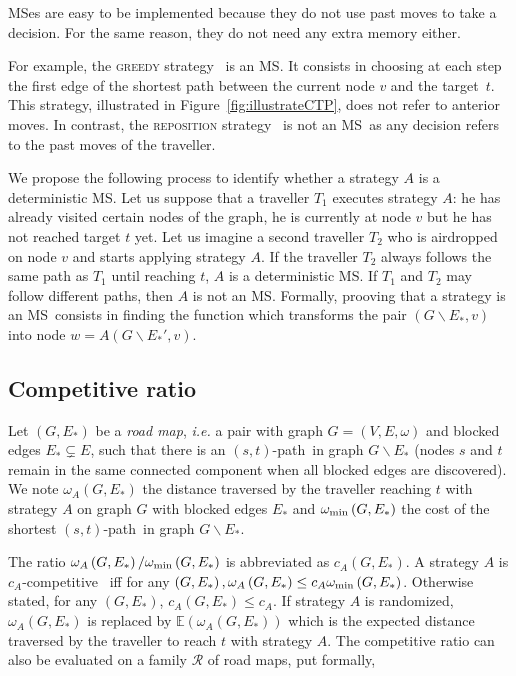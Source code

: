 \documentclass[11pt,letterpaper]{article}
\newcommand{\stpath}{$(s,t)$-path}
\newcommand{\omegamin}{\omega_{\mbox{\scriptsize{min}}}}
\newcommand{\mts}{MS}
\begin{document}
\mts es are easy to be implemented because they do not use past moves to take a decision.  For the same reason, they do not need any extra memory either.

For example, the \textsc{greedy} strategy~\cite{XuHuSuZh09} is an \mts . It consists in choosing at each step the first edge of the shortest path between the current node $v$ and the target~$t$. This strategy, illustrated in Figure~\ref{fig:illustrateCTP}, does not refer to anterior moves. In contrast, the \textsc{reposition} strategy~\cite{We08} is not an \mts ~as any decision refers to the past moves of the traveller. 

We propose the following process to identify whether a strategy $A$ is a deterministic \mts . Let us suppose that a traveller $T_1$ executes strategy $A$: he has already visited certain nodes of the graph, he is currently at node $v$ but he has not reached target $t$ yet. Let us imagine a second traveller $T_2$ who is airdropped on node $v$ and starts applying strategy $A$. If the traveller $T_2$ always follows the same path as $T_1$ until reaching $t$, $A$ is a deterministic \mts . If $T_1$ and $T_2$ may follow different paths, then $A$ is not an \mts . Formally, prooving that a strategy is an \mts ~consists in finding the function which transforms the pair $\left(G\backslash E_*,v\right)$ into node $w = A\left(G\backslash E_*',v\right)$.

\subsection{Competitive ratio} \label{subsec:compratio}

Let $\left(G,E_*\right)$ be a \textit{road map}, {\em i.e.} a pair with graph $G=\left(V,E,\omega\right)$ and blocked edges $E_* \subsetneq E$, such that there is an \stpath ~in graph $G\backslash E_*$ (nodes $s$ and $t$ remain in the same connected component when all blocked edges are discovered). We note $\omega_A\left(G,E_*\right)$ the distance traversed by the traveller reaching $t$ with strategy $A$ on graph $G$ with blocked edges $E_*$ and $\omegamin\left(G,E_*\right)$ the cost of the shortest \stpath ~in graph $G\backslash E_*$.

The ratio $\omega_A\left(G,E_*\right)/\omegamin\left(G,E_*\right)$ is abbreviated as $c_A\left(G,E_*\right)$. A strategy $A$ is $c_A$-competitive~\cite{BoEl98,XuHuSuZh09} iff for any $\left(G,E_*\right), \omega_A\left(G,E_*\right) \leq c_A \omegamin\left(G,E_*\right)$. Otherwise stated, for any $\left(G,E_*\right)$, $c_A\left(G,E_*\right) \leq c_A$. If strategy $A$ is randomized, $\omega_A\left(G,E_*\right)$ is replaced by $\mathbb{E}\left(\omega_A\left(G,E_*\right)\right)$ which is the expected distance traversed by the traveller to reach $t$ with strategy $A$. The competitive ratio can also be evaluated on a family $\mathcal{R}$ of road maps, put formally,
\end{document}
